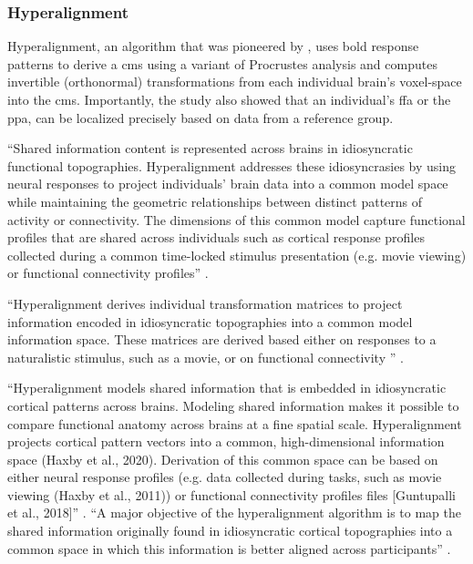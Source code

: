 \subsubsection{Hyperalignment}

%
Hyperalignment, an algorithm that was pioneered by \citet{haxby2011common}, uses
\ac{bold} response patterns to derive a \ac{cms} using a variant of Procrustes
analysis and computes invertible (orthonormal) transformations from each
individual brain's voxel-space into the \ac{cms}.
%
Importantly, the study also showed that an individual's \ac{ffa} or the
\ac{ppa}, can be localized precisely based on data from a reference group.

``Shared information content is represented across brains in idiosyncratic
functional topographies. Hyperalignment addresses these idiosyncrasies by using
neural responses to project individuals’ brain data into a common model space
while maintaining the geometric relationships between distinct patterns of
activity or connectivity. The dimensions of this common model capture functional
profiles that are shared across individuals such as cortical response profiles
collected during a common time-locked stimulus presentation (e.g. movie viewing)
or functional connectivity profiles'' \citep{busch2021hybrid}.

%
``Hyperalignment derives individual transformation matrices to project
information encoded in idiosyncratic topographies into a common model
information space. These matrices are derived based either on responses to a
naturalistic stimulus, such as a movie, or on functional connectivity
\citep{guntupalli2018computational}'' \citep{jiahui2020predicting}.

%
``Hyperalignment models shared information that is embedded in idiosyncratic
cortical patterns across brains. Modeling shared information makes it possible
to compare functional anatomy across brains at a fine spatial scale.
Hyperalignment projects cortical pattern vectors into a common, high-dimensional
information space (Haxby et al., 2020). Derivation of this common space can be
based on either neural response profiles (e.g. data collected during tasks, such
as movie viewing (Haxby et al., 2011)) or functional connectivity profiles files
[Guntupalli et al., 2018]'' \citep{busch2021hybrid}.
%
``A major objective of the hyperalignment algorithm is to map the shared
information originally found in idiosyncratic cortical topographies into a
common space in which this information is better aligned across participants''
\citep{busch2021hybrid}.

